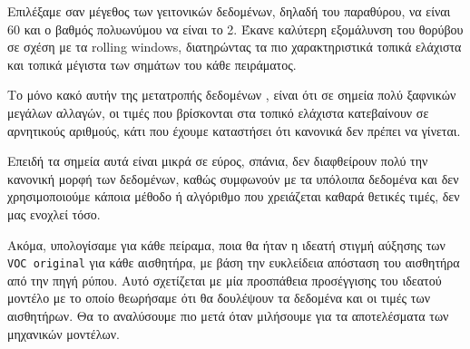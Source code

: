 Επιλέξαμε σαν μέγεθος των γειτονικών δεδομένων, δηλαδή του παραθύρου, να είναι 60 και ο βαθμός πολυωνύμου να είναι το 2.
Έκανε καλύτερη εξομάλυνση του θορύβου σε σχέση με τα rolling windows, διατηρώντας τα πιο χαρακτηριστικά
τοπικά ελάχιστα και τοπικά μέγιστα των σημάτων του κάθε πειράματος.

Το μόνο κακό αυτήν της μετατροπής δεδομένων , είναι ότι σε σημεία
πολύ ξαφνικών μεγάλων αλλαγών, οι τιμές που βρίσκονται στα τοπικό ελάχιστα κατεβαίνουν σε αρνητικούς αριθμούς,
κάτι που έχουμε καταστήσει ότι κανονικά δεν πρέπει να γίνεται.

Επειδή τα σημεία αυτά είναι μικρά σε εύρος, σπάνια, δεν διαφθείρουν πολύ την κανονική μορφή των δεδομένων, καθώς συμφωνούν με τα υπόλοιπα δεδομένα και δεν χρησιμοποιούμε
κάποια μέθοδο ή αλγόριθμο που χρειάζεται καθαρά θετικές τιμές, δεν μας ενοχλεί τόσο.

Ακόμα, υπολογίσαμε για κάθε πείραμα, ποια θα ήταν η ιδεατή στιγμή αύξησης των \texttt{VOC original} για κάθε αισθητήρα,
με βάση την ευκλείδεια απόσταση του αισθητήρα από την πηγή ρύπου.
Αυτό σχετίζεται με μία προσπάθεια προσέγγισης του ιδεατού μοντέλο με το οποίο θεωρήσαμε ότι θα δουλέψουν
τα δεδομένα και οι τιμές των αισθητήρων.
 Θα το αναλύσουμε πιο μετά όταν μιλήσουμε για τα αποτελέσματα των μηχανικών μοντέλων.
